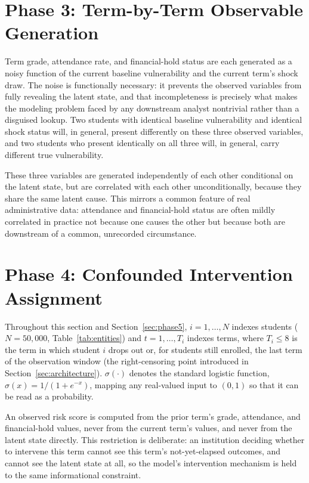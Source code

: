 \documentclass[11pt]{article}
\begin{document}
\section{Phase 3: Term-by-Term Observable Generation}
\label{sec:phase3}

Term grade, attendance rate, and financial-hold status are each generated as a noisy function of the current baseline vulnerability and the current term's shock draw. The noise is functionally necessary: it prevents the observed variables from fully revealing the latent state, and that incompleteness is precisely what makes the modeling problem faced by any downstream analyst nontrivial rather than a disguised lookup. Two students with identical baseline vulnerability and identical shock status will, in general, present differently on these three observed variables, and two students who present identically on all three will, in general, carry different true vulnerability.

These three variables are generated independently of each other conditional on the latent state, but are correlated with each other unconditionally, because they share the same latent cause. This mirrors a common feature of real administrative data: attendance and financial-hold status are often mildly correlated in practice not because one causes the other but because both are downstream of a common, unrecorded circumstance.


\FloatBarrier
\section{Phase 4: Confounded Intervention Assignment}
\label{sec:phase4}

Throughout this section and Section~\ref{sec:phase5}, $i = 1,\ldots,N$ indexes students ($N=50{,}000$, Table~\ref{tab:entities}) and $t = 1,\ldots,T_i$ indexes terms, where $T_i \le 8$ is the term in which student $i$ drops out or, for students still enrolled, the last term of the observation window (the right-censoring point introduced in Section~\ref{sec:architecture}). $\sigma(\cdot)$ denotes the standard logistic function, $\sigma(x) = 1/(1+e^{-x})$, mapping any real-valued input to $(0,1)$ so that it can be read as a probability.

An observed risk score is computed from the prior term's grade, attendance, and financial-hold values, never from the current term's values, and never from the latent state directly. This restriction is deliberate: an institution deciding whether to intervene this term cannot see this term's not-yet-elapsed outcomes, and cannot see the latent state at all, so the model's intervention mechanism is held to the same informational constraint.
\end{document}
